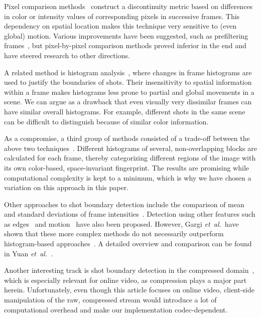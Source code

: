 \documentclass[10pt,twocolumn,letterpaper]{article}
\begin{document}
Pixel comparison methods~\cite{Hampapur1994, Zhang1993} construct a discontinuity metric based on differences in color or intensity values of corresponding pixels in successive frames. This dependency on spatial location makes this technique very sensitive to (even global) motion. Various improvements have been suggested, such as prefiltering frames~\cite{Zhang1995}, but pixel-by-pixel comparison methods proved inferior in the end and have steered research to other directions.

A related method is histogram analysis~\cite{Smeaton1999}, where changes in frame histograms are used to justify the boundaries of shots. Their insensitivity to spatial information within a frame makes histograms less prone to partial and global movements in a scene. We can argue as a drawback that even visually very dissimilar frames can have similar overall histograms. For example, different shots in the same scene can be difficult to distinguish because of similar color information.

As a compromise, a third group of methods consisted of a trade-off between the above two techniques~\cite{Ahmed1999}. Different histograms of several, non-overlapping blocks are calculated for each frame, thereby categorizing different regions of the image with its own color-based, space-invariant fingerprint. The results are promising while computational complexity is kept to a minimum, which is why we have chosen a variation on this approach in this paper.

Other approaches to shot boundary detection include the comparison of mean and standard deviations of frame intensities~\cite{Lienhart1999}. Detection using other features such as edges~\cite{Zabih1995} and motion~\cite{Bouthemy1997} have also been proposed. However, Gargi \emph{et~al.}\ have shown that these more complex methods do not necessarily outperform histogram-based approaches~\cite{Gargi2000}. A detailed overview and comparison can be found in Yuan \emph{et~al.}~\cite{Yuan2007}. 

Another interesting track is shot boundary detection in the compressed domain~\cite{Yeo1995}, which is especially relevant for online video, as compression plays a major part herein. Unfortunately, even though this article focuses on online video, client-side manipulation of the raw, compressed stream would introduce a lot of computational overhead and make our implementation codec-dependent.
\end{document}
